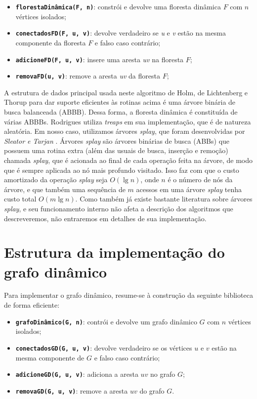 \begin{itemize}
    \item \texttt{\textbf{florestaDinâmica(F, n)}}: constrói e devolve uma floresta dinâmica $F$ com $n$ vértices isolados;
    \item \texttt{\textbf{conectadosFD(F, u, v)}}: devolve verdadeiro se \textit{u} e \textit{v} estão na mesma componente da floresta $F$ e falso caso contrário;
    \item \texttt{\textbf{adicioneFD(F, u, v)}}: insere uma aresta \textit{uv} na floresta $F$;
    \item \texttt{\textbf{removaFD(u, v)}}: remove a aresta \textit{uv} da floresta $F$;
\end{itemize}

A estrutura de dados principal usada neste algoritmo de Holm, de Lichtenberg e Thorup para dar suporte eficientes às rotinas acima é uma árvore binária de busca balanceada (ABBB). Dessa forma, a floresta dinâmica é constituída de várias ABBBs. Rodrigues utiliza \textit{treaps} em sua implementação, que é de natureza aleatória. Em nosso caso, utilizamos árvores \textit{splay}, que foram desenvolvidas por \textit{Sleator e Tarjan} \cite{sleator}. Árvores \textit{splay} são árvores binárias de busca (ABBs) que possuem uma rotina extra (além das usuais de busca, inserção e remoção) chamada \textit{splay}, que é acionada ao final de cada operação feita na árvore, de modo que é sempre aplicada ao nó mais profundo visitado. Isso faz com que o custo amortizado da operação \textit{splay} seja $O(\lg n)$, onde $n$ é o número de nós da árvore, e que também uma sequência de $m$ acessos em uma árvore \textit{splay} tenha custo total $O(m \lg n)$.  Como também já existe bastante literatura sobre árvores \textit{splay}, e seu funcionamento interno não afeta a descrição dos algoritmos que descreveremos, não entraremos em detalhes de sua implementação.

\section{Estrutura da implementação do grafo dinâmico}

Para implementar o grafo dinâmico, resume-se à construção da seguinte biblioteca de forma eficiente:

\begin{itemize}
    \item \texttt{\textbf{grafoDinâmico(G, n)}}: contrói e devolve um grafo dinâmico $G$ com $n$ vértices isolados;
    \item \texttt{\textbf{conectadosGD(G, u, v)}}: devolve verdadeiro se os vértices $u$ e $v$ estão na mesma componente de $G$ e falso caso contrário;
    \item \texttt{\textbf{adicioneGD(G, u, v)}}: adiciona a aresta $uv$ no grafo $G$;
    \item \texttt{\textbf{removaGD(G, u, v)}}: remove a aresta $uv$ do grafo $G$.
\end{itemize} 

